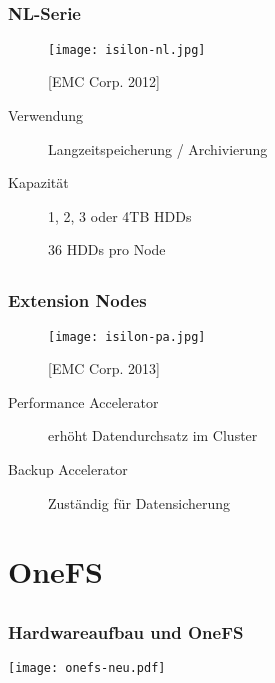 \documentclass{beamer}
\begin{document}
\subsection{}
\begin{frame}[fragile]
  \frametitle{NL-Serie}
  
  \begin{figure}[htp]
    \centering
    \texttt{[image: isilon-nl.jpg]}
    \caption{[EMC Corp. 2012]}
  \end{figure}
  
  \begin{description} 
    \item[Verwendung] Langzeitspeicherung / Archivierung
    \vspace{5mm}
    \item[Kapazität] 1, 2, 3 oder 4TB HDDs
    \item[] 36 HDDs pro Node 
        
  \end{description}

\end{frame}

\subsection{}
\begin{frame}[fragile]
  \frametitle{Extension Nodes}
  \begin{figure}[htp]
    \centering
    \texttt{[image: isilon-pa.jpg]}
    \caption{[EMC Corp. 2013]}
  \end{figure}
  
  \begin{description}
    \item[Performance Accelerator] erhöht Datendurchsatz im Cluster
    \item[Backup Accelerator] Zuständig für Datensicherung
  \end{description}

  
\end{frame}

\section{OneFS}

\subsection{}
\begin{frame}[fragile]
  \frametitle{Hardwareaufbau und OneFS}

  \begin{center}\texttt{[image: onefs-neu.pdf]}\end{center}

\end{frame}  
\end{document}
